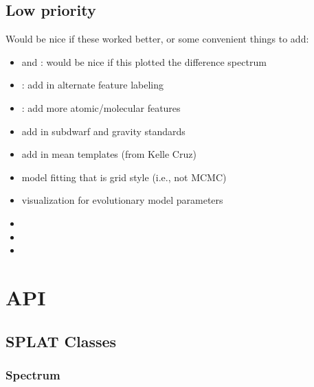 \documentclass[letterpaper,10pt,english]{sphinxmanual}
\begin{document}
\subsection{Low priority}
\label{bugs:low-priority}
Would be nice if these worked better, or some convenient things to add:
\begin{itemize}
\item {} 
 and : would be nice if this plotted the difference spectrum

\item {} 
: add in alternate feature labeling

\item {} 
: add more atomic/molecular features

\item {} 
add in subdwarf and gravity standards

\item {} 
add in mean templates (from Kelle Cruz)

\item {} 
model fitting that is grid style (i.e., not MCMC)

\item {} 
visualization for evolutionary model parameters

\end{itemize}
\begin{itemize}
\item {} 

\item {} 

\item {} 

\end{itemize}


\section{API}
\label{api::doc}\label{api:api}

\subsection{SPLAT Classes}
\label{api:splat-classes}

\subsubsection{Spectrum}
\label{api:spectrum}
\end{document}
